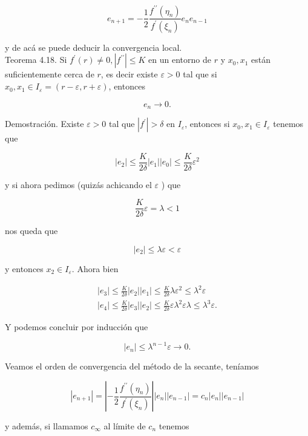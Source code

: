 \documentclass[10pt]{book}
\begin{document}
$$
e_{n+1}=-\frac{1}{2} \frac{f^{\prime \prime}\left(\eta_{n}\right)}{f^{\prime}\left(\xi_{n}\right)} e_{n} e_{n-1}
$$

y de acá se puede deducir la convergencia local.\\
Teorema 4.18. Si $f^{\prime}(r) \neq 0,\left|f^{\prime \prime}\right| \leq K$ en un entorno de $r$ y $x_{0}, x_{1}$ están suficientemente cerca de $r$, es decir existe $\varepsilon>0$ tal que si $x_{0}, x_{1} \in I_{\varepsilon}=(r-\varepsilon, r+\varepsilon)$, entonces

$$
e_{n} \rightarrow 0 .
$$

Demostración. Existe $\varepsilon>0$ tal que $\left|f^{\prime}\right|>\delta$ en $I_{\varepsilon}$, entonces si $x_{0}, x_{1} \in I_{\varepsilon}$ tenemos que

$$
\left|e_{2}\right| \leq \frac{K}{2 \delta}\left|e_{1}\right|\left|e_{0}\right| \leq \frac{K}{2 \delta} \varepsilon^{2}
$$

y si ahora pedimos (quizás achicando el $\varepsilon$ ) que

$$
\frac{K}{2 \delta} \varepsilon=\lambda<1
$$

nos queda que

$$
\left|e_{2}\right| \leq \lambda \varepsilon<\varepsilon
$$

y entonces $x_{2} \in I_{\varepsilon}$. Ahora bien

$$
\begin{gathered}
\left|e_{3}\right| \leq \frac{K}{2 \delta}\left|e_{2}\right|\left|e_{1}\right| \leq \frac{K}{2 \delta} \lambda \varepsilon^{2} \leq \lambda^{2} \varepsilon \\
\left|e_{4}\right| \leq \frac{K}{2 \delta}\left|e_{3}\right|\left|e_{2}\right| \leq \frac{K}{2 \delta} \varepsilon \lambda^{2} \varepsilon \lambda \leq \lambda^{3} \varepsilon .
\end{gathered}
$$

Y podemos concluir por inducción que

$$
\left|e_{n}\right| \leq \lambda^{n-1} \varepsilon \rightarrow 0 .
$$

Veamos el orden de convergencia del método de la secante, teníamos

$$
\left|e_{n+1}\right|=\left|-\frac{1}{2} \frac{f^{\prime \prime}\left(\eta_{n}\right)}{f^{\prime}\left(\xi_{n}\right)}\right|\left|e_{n}\right|\left|e_{n-1}\right|=c_{n}\left|e_{n}\right|\left|e_{n-1}\right|
$$

y además, si llamamos $c_{\infty}$ al límite de $c_{n}$ tenemos
\end{document}
